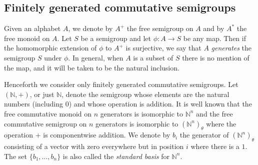 \documentclass{acmconf}
\def\N{{\mathbb{N}}}
\begin{document}
\subsection{Finitely generated commutative semigroups}
Given an alphabet $A$, we denote by $A^+$ the free semigroup on $A$
and by $A^*$ the free monoid on $A$. Let $S$ be a semigroup and let
$\phi: A \rightarrow S$ be any map. 
Then if the homomorphic extension of
$\phi$ to $A^+$ is surjective, we say that $A$ 
{\em generates} the semigroup $S$ under $\phi$.
In general, when $A$ is a subset of $S$
there is no mention of the map, and it will be 
taken to be the natural inclusion.




Henceforth we consider only finitely generated commutative semigroups.
Let $(\N, +)$, or just $\N$,  denote the  semigroup whose
elements are the natural numbers (including 0) and whose operation is
addition. It is well known that the 
free commutative monoid on  $n$ generators is isomorphic to $\N^n$  
and the free commutative semigroup on $n$ generators is isomorphic to 
$(\N^n)_\theta$ where the operation $+$ is componentwise addition. 
We denote by $b_i$ the generator of $(\N^n)_\theta$ consisting of
a vector with zero everywhere but in position $i$ where there is a 
$1$. The set $\{b_1, \ldots, b_n\}$ is also called the {\em standard basis}
for $\N^n$.
\end{document}
